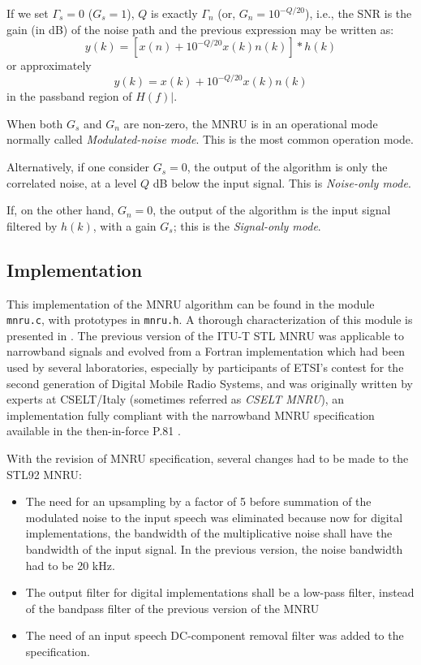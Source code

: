 If we set $\Gamma_s=0$ ($G_s=1$), $Q$ is exactly $\Gamma_n$ (or, $G_n=10^{-Q/20}$), i.e., the SNR is the gain (in dB) of the noise
path and the previous expression may be written as:
\[
y(k)=[x(n)+10^{-Q/20} x(k) n(k)] \ast h(k)
\]
or approximately
\[
y(k)=x(k)+10^{-Q/20} x(k) n(k)
\]
in the passband region of $H(f)|$.

When both $G_s$ and $G_n$ are non-zero, the MNRU is in an operational
mode normally called {\em Modulated-noise mode}. This is the most
common operation mode.

Alternatively, if one consider $G_s=0$, the output of the algorithm is
only the correlated noise, at a level $Q$ dB below the input signal.
This is {\em Noise-only mode}.

If, on the other hand, $G_n=0$, the output of the algorithm is the
input signal filtered by $h(k)$, with a gain $G_s$; this is the {\em
Signal-only mode}.

\subsection{Implementation}

This implementation of the MNRU algorithm can be found in the module
{\tt mnru.c}, with prototypes in {\tt mnru.h}. A thorough
characterization of this module is presented in \cite{Duo-MNRU}. The
previous version of the ITU-T STL MNRU was applicable to narrowband
signals and evolved from a Fortran implementation which had been used
by several laboratories, especially by participants of ETSI's
contest for the second generation of Digital Mobile Radio Systems,
and was originally written by experts at CSELT/Italy (sometimes
referred as {\em CSELT MNRU}), an implementation fully compliant with
the narrowband MNRU specification available in the then-in-force P.81
\cite{Old-P.81}.

With the revision of MNRU specification, several changes had to be
made to the STL92 MNRU:
\begin{itemize}
  \item The need for an upsampling by a factor of 5 before summation
        of the modulated noise to the input speech was eliminated
        because now for digital implementations, the bandwidth of the
        multiplicative noise shall have the bandwidth of the input
        signal. In the previous version, the noise bandwidth had to be
        20 kHz.
  \item The output filter for digital implementations shall be a
        low-pass filter, instead of the bandpass filter of the
        previous version of the MNRU
  \item The need of an input speech DC-component removal filter
        was added to the specification.
\end{itemize}

